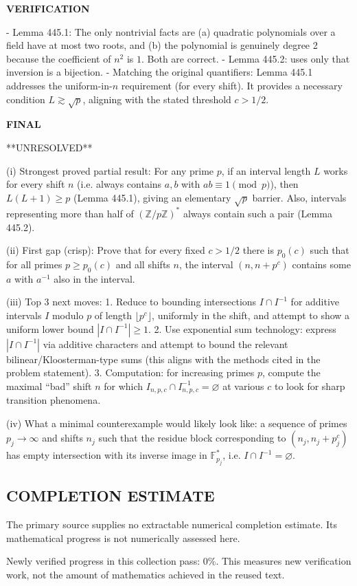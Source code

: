 \medskip
\noindent\textbf{VERIFICATION}

- Lemma 445.1: The only nontrivial facts are (a) quadratic polynomials over a field have at most two roots, and (b) the polynomial is genuinely degree 2 because the coefficient of $n^2$ is $1$. Both are correct.
- Lemma 445.2: uses only that inversion is a bijection.
- Matching the original quantifiers: Lemma 445.1 addresses the uniform-in-$n$ requirement (for every shift). It provides a necessary condition $L\gtrsim\sqrt p$, aligning with the stated threshold $c>1/2$.

\medskip
\noindent\textbf{FINAL}

**UNRESOLVED**

(i) Strongest proved partial result: For any prime $p$, if an interval length $L$ works for every shift $n$ (i.e. always contains $a,b$ with $ab\equiv1\pmod p$), then $L(L+1)\ge p$ (Lemma 445.1), giving an elementary $\sqrt p$ barrier. Also, intervals representing more than half of $(\mathbb Z/p\mathbb Z)^*$ always contain such a pair (Lemma 445.2).

(ii) First gap (crisp): Prove that for every fixed $c>1/2$ there is $p_0(c)$ such that for all primes $p\ge p_0(c)$ and all shifts $n$, the interval $(n,n+p^c)$ contains some $a$ with $a^{-1}$ also in the interval.

(iii) Top 3 next moves:
1. Reduce to bounding intersections $I\cap I^{-1}$ for additive intervals $I$ modulo $p$ of length $\lfloor p^c\rfloor$, uniformly in the shift, and attempt to show a uniform lower bound $|I\cap I^{-1}|\ge 1$.
2. Use exponential sum technology: express $|I\cap I^{-1}|$ via additive characters and attempt to bound the relevant bilinear/Kloosterman-type sums (this aligns with the methods cited in the problem statement).
3. Computation: for increasing primes $p$, compute the maximal ``bad'' shift $n$ for which $I_{n,p,c}\cap I_{n,p,c}^{-1}=\varnothing$ at various $c$ to look for sharp transition phenomena.

(iv) What a minimal counterexample would likely look like: a sequence of primes $p_j\to\infty$ and shifts $n_j$ such that the residue block corresponding to $(n_j,n_j+p_j^c)$ has empty intersection with its inverse image in $\mathbb F_{p_j}^*$, i.e. $I\cap I^{-1}=\varnothing$.




\subsection*{COMPLETION ESTIMATE}
The primary source supplies no extractable numerical completion estimate. Its mathematical progress is not numerically assessed here.

Newly verified progress in this collection pass: $0\%$. This measures new verification work, not the amount of mathematics achieved in the reused text.
